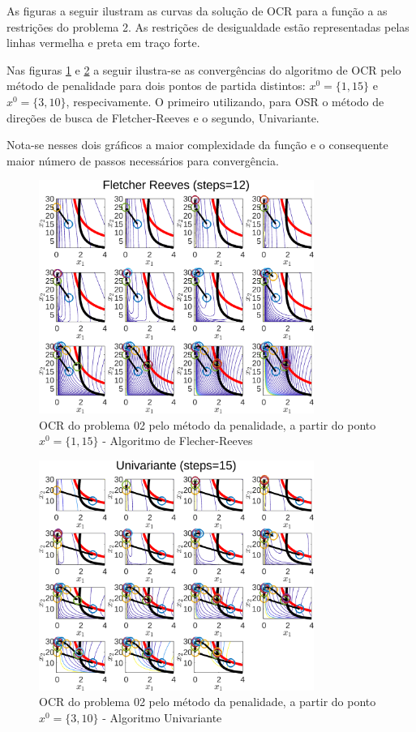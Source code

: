 \documentclass[10pt, a4paper]{article}
\begin{document}

As figuras a seguir ilustram as curvas da solu\c c\~ao de OCR para a fun\c c\~ao a as restri\c c\~oes do problema 2. As restri\c c\~oes de desigualdade est\~ao representadas pelas linhas vermelha e preta em tra\c co forte.

Nas figuras \ref{fig:fig05} e \ref{fig:fig06} a seguir ilustra-se as converg\^encias do algoritmo de OCR pelo m\'etodo de penalidade para dois pontos de partida distintos: $x^0=\{1,15\}$ e $x^0=\{3,10\}$, respecivamente. O primeiro utilizando, para OSR o m\'etodo de dire\c c\~oes de busca de Fletcher-Reeves e o segundo, Univariante.

Nota-se nesses dois gr\'aficos a maior complexidade da fun\c c\~ao e o consequente maior n\'umero de passos necess\'arios para converg\^encia.

\begin{figure}[H]
      \centering
      \includegraphics[width=0.8\textwidth]{fig05_P02_PEN_X1_FR.png}
      \caption{OCR do problema 02 pelo m\'etodo da penalidade, a partir do ponto $x^0=\{1,15\}$ - Algoritmo de Flecher-Reeves}
      \label{fig:fig05}
\end{figure}
\begin{figure}[H]
      \centering
      \includegraphics[width=0.8\textwidth]{fig06_P02_PEN_X2_UNI.png}
      \caption{OCR do problema 02 pelo m\'etodo da penalidade, a partir do ponto $x^0=\{3,10\}$ - Algoritmo Univariante}
      \label{fig:fig06}
\end{figure}
\end{document}
